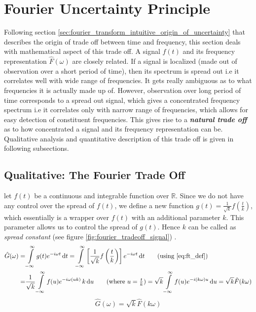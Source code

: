 \documentclass[11pt, a4paper]{article}
\let\oldsection\section
\renewcommand{\section}{%
	\setcounter{equation}{0}%
	\oldsection%
}
\newcommand{\quotedsingle}[1]{#1}	%
\newcommand{\quotedsingleit}[1]{\quotedsingle{\textit{#1}}}	%
\newcommand{\eqrefnp}[1]{\textup{\ref{#1}}}  %
\newcommand{\diff}{\mathop{}\!\mathrm{d}}
\newcommand{\du}{\diff u}
\newcommand{\dt}{\diff t}
\newcommand{\dint}[2]{\int \limits_{#1}^{#2}}  %
\newcommand{\intinfty}{\dint{-\infty}{\infty}}	%
\begin{document}
	\section{Fourier Uncertainty Principle}\label{sec:fourier_uncertainity_principle}
	Following section \ref{sec:fourier_transform_intuitive_origin_of_uncertainty} that describes the origin of trade off between time and frequency, this section deals with mathematical aspect of this trade off. A signal $f(t)$ and its frequency representation $\hat{F}(\omega)$ are closely related. If a signal is localized (made out of observation over a short period of time), then its spectrum is spread out i.e it correlates well with wide range of frequencies. It gets really ambiguous as to what frequencies it is actually made up of. However, observation over long period of time corresponds to a spread out signal, which gives a concentrated frequency spectrum i.e it correlates only with narrow range of frequencies, which allows for easy detection of constituent frequencies. This gives rise to a \quotedsingleit{\textbf{natural trade off}} as to how concentrated a signal and its frequency representation can be. Qualitative analysis and quantitative description of this trade off is given in following subsections.
	
	\subsection{Qualitative: The Fourier Trade Off}\label{sec:fourier_uncertainity_principle_qualitative}
	let $f(t)$ be a continuous and integrable function over $\mathbb{R}$. Since we do not have any control over the spread of $f(t)$, we define a new function $g(t) = \frac{1}{\sqrt{k}} f \left( \frac{t}{k} \right)$, which essentially is a wrapper over $f(t)$ with an additional parameter $k$. This parameter allows us to control the spread of $g(t)$. Hence $k$ can be called as \quotedsingleit{spread constant} (see figure \ref{fig:fourier_tradeoff_signal}) \cite{dubey2021fourieruncertainity}.
	\begin{align*}
		\hat{G}(\omega) = & \intinfty g(t) e^{-i \omega t} \dt
		= \intinfty \left[ \frac{1}{\sqrt{k}} f \left( \frac{t}{k} \right) \right] e^{-i \omega t} \dt  \tag{using \eqrefnp{eq:ft_def}} \\
		= & \frac{1}{\sqrt{k}} \intinfty f(u) e^{-i \omega (uk)} \, k \du  \tag{where $u = \frac{t}{k}$} 
		= \sqrt{k} \intinfty f(u) e^{-i (k \omega) u} \du = \sqrt{k} \hat{F}(k \omega) 
	\end{align*}
	\begin{equation}\label{eq:fourier_tradeoff_spectrum}
		\boxed{
			\hat{G}(\omega) = \sqrt{k} \hat{F}(k \omega)
		}
	\end{equation}
	
\end{document}
